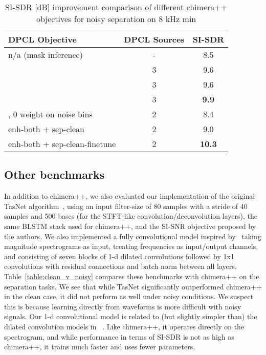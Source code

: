 \documentclass[a4paper]{article}
\begin{document}
\begin{table}[h]
    \footnotesize
    \caption{SI-SDR [dB] improvement comparison of different chimera++ objectives for noisy separation on 8 kHz min}\vspace{-0.5cm}
    \begin{center}
      \label{table:chimera_compare}
      \begin{tabular}{lcc}\hline
        DPCL Objective & DPCL Sources &  SI-SDR \\ \hline \hline
        n/a (mask inference) & - & \phantom{1}8.5  \\
         & 3 & \phantom{1}9.6  \\
         & 3 & \phantom{1}9.6  \\
         & 3 & {\bf \phantom{1}9.9}  \\
        , 0 weight on noise bins & 2 & \phantom{1}8.4  \\ \hline
        enh-both + sep-clean & 2 & \phantom{1}9.0  \\
        enh-both + sep-clean-finetune & 2 & {\bf 10.3}  \\ \hline
      \end{tabular}
    \end{center}\vspace{-0.6cm}
  \end{table}
  
  
\subsection{Other benchmarks}
\label{sec:benchmarks}
In addition to chimera++, we also evaluated our implementation of the original TasNet algorithm~\cite{Luo2018}, using an input filter-size of 80 samples with a stride of 40 samples and 500 bases (for the STFT-like convolution/deconvolution layers), the same BLSTM stack used for chimera++, and the SI-SNR objective proposed by the authors.  We also implemented a fully convolutional model inspired by~\cite{LeaFVRH16} taking magnitude spectrograms as input, treating frequencies as input/output channels, and consisting of seven blocks of 1-d dilated convolutions followed by 1x1 convolutions with residual connections and batch norm between all layers.  Table~\ref{table:clean_v_noisy} compares these benchmarks with chimera++ on the separation tasks.  We see that while TasNet significantly outperformed chimera++ in the clean case, it did not perform as well under noisy conditions.  We suspect this is because learning directly from waveforms is more difficult with noisy signals.  Our 1-d convolutional model is related to (but slightly simpler than) the dilated convolution models in ~\cite{Luo2018TasNet09arXiv, shi2019furcanext}.  Like chimera++, it operates directly on the spectrogram, and while performance in terms of SI-SDR is not as high as chimera++, it trains much faster and uses fewer parameters.
  
\end{document}
